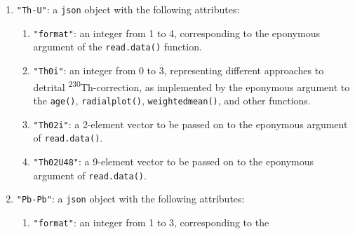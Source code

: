 \begin{refsection}
\begin{enumerate}[leftmargin=\parindent,align=left,
      labelwidth=\parindent,label*=2.\arabic*.]
\begin{enumerate}[leftmargin=\parindent,align=left,labelwidth=\parindent,label*=\arabic*.]
  \item{\tt "commonPb"}: an integer between 0 and 3, to be supplied to
    the \texttt{option} argument of the \texttt{Pb0corr()} function.
  \item{\tt "diseq"}: logical. If \texttt{true}, applies an initial
    disequilibrium correction using the \texttt{diseq()} function.
  \item{\tt "U48"}: two-element vector containing the arguments
    \texttt{x} and \texttt{option} of the eponymous argument to the
    \texttt{diseq()} function.
  \item{\tt "ThU"}: two-element vector containing the arguments
    \texttt{x} and \texttt{option} of the eponymous argument to the
    \texttt{diseq()} function.
  \item{\tt "RaU"}: two-element vector containing the arguments
    \texttt{x} and \texttt{option} of the eponymous argument to the
    \texttt{diseq()} function.
  \item{\tt "PaU"}: two-element vector containing the arguments
    \texttt{x} and \texttt{option} of the eponymous argument to the
    \texttt{diseq()} function.
  \end{enumerate}
\item{\tt "Th-U"}: a \texttt{json} object with the following
  attributes:
  \begin{enumerate}[leftmargin=\parindent,align=left,labelwidth=\parindent,label*=\arabic*.]
  \item{\tt "format"}: an integer from 1 to 4, corresponding to the
    eponymous argument of the \texttt{read.data()} function.
  \item{\tt "Th0i"}: an integer from 0 to 3, representing different
    approaches to detrital \textsuperscript{230}Th-correction, as
    implemented by the eponymous argument to the \texttt{age()},
    \texttt{radialplot()}, \texttt{weightedmean()}, and other
    functions.
  \item{\tt "Th02i"}: a 2-element vector to be passed on to the
    eponymous argument of \texttt{read.data()}.
  \item{\tt "Th02U48"}: a 9-element vector to be passed on to the
    eponymous argument of \texttt{read.data()}.
  \end{enumerate}
\item{\tt "Pb-Pb"}: a \texttt{json} object with the following
  attributes:
  \begin{enumerate}[leftmargin=\parindent,align=left,labelwidth=\parindent,label*=\arabic*.]
  \item{\tt "format"}: an integer from 1 to 3, corresponding to the

\end{enumerate}
\end{enumerate}
\end{refsection}
